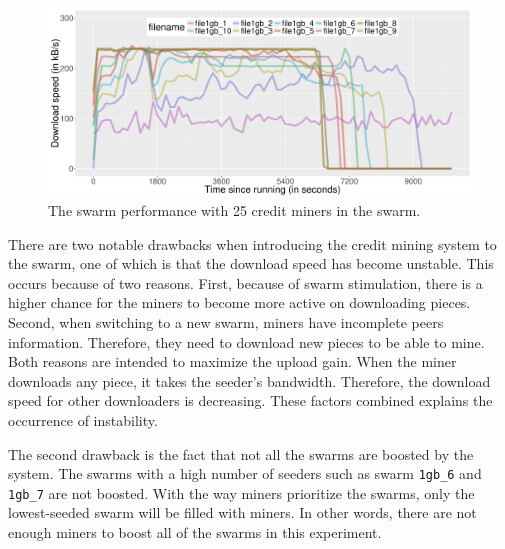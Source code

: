 \begin{figure}[h!]
	\centering
	\includegraphics[width=\textwidth]{pics/results/swperf_sc2_25.png}
	\caption{The swarm performance with 25 credit miners in the swarm.}
	\label{fig:swarmcm25perf}
\end{figure}

There are two notable drawbacks when introducing the credit mining system to the swarm, one of which is that the download speed has become unstable. This occurs because of two reasons. First, because of swarm stimulation, there is a higher chance for the miners to become more active on downloading pieces. Second, when switching to a new swarm, miners have incomplete peers information. Therefore, they need to download new pieces to be able to mine. Both reasons are intended to maximize the upload gain. When the miner downloads any piece, it takes the seeder's bandwidth. Therefore, the download speed for other downloaders is decreasing. These factors combined explains the occurrence of instability.

The second drawback is the fact that not all the swarms are boosted by the system. The swarms with a high number of seeders such as swarm \texttt{1gb\_6} and \texttt{1gb\_7} are not boosted. With the way miners prioritize the swarms, only the lowest-seeded swarm will be filled with miners. In other words, there are not enough miners to boost all of the swarms in this experiment.

\vspace{-0.3cm} 
